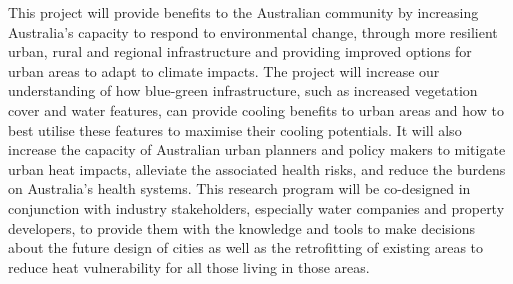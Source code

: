 This project will provide benefits to the Australian community by increasing Australia's capacity to respond to environmental change, through more resilient urban, rural and regional infrastructure and providing improved options for urban areas to adapt to climate impacts. The project will increase our understanding of how blue-green infrastructure, such as increased vegetation cover and water features, can provide cooling benefits to urban areas and how to best utilise these features to maximise their cooling potentials. It will also increase the capacity of Australian urban planners and policy makers to mitigate urban heat impacts, alleviate the associated health risks, and reduce the burdens on Australia's health systems. This research program will be co-designed in conjunction with industry stakeholders, especially water companies and property developers, to provide them with the knowledge and tools to make decisions about the future design of cities as well as the retrofitting of existing areas to reduce heat vulnerability for all those living in those areas.



 








